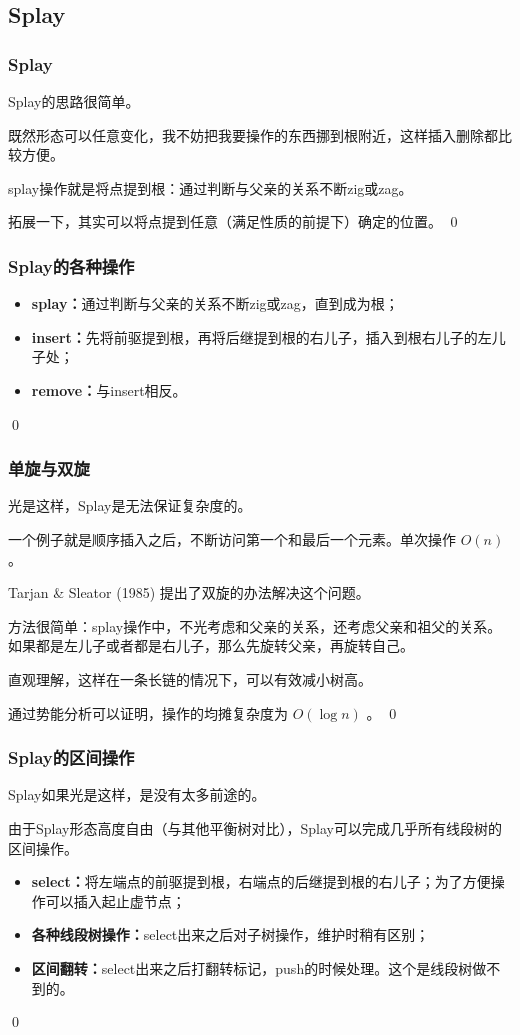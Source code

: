 \documentclass[9pt,dvipsnames,table]{beamer}
\newenvironment{qedframe}{%
	\begin{frame}[environment=qedqedframe]%
	}{%
	\qed
	\end{frame}%
}
\begin{document}
\subsection{Splay}
\begin{qedframe}
	\frametitle{Splay}
	Splay的思路很简单。
	
	既然形态可以任意变化，我不妨把我要操作的东西挪到根附近，这样插入删除都比较方便。
	
	splay操作就是将点提到根：通过判断与父亲的关系不断zig或zag。
	
	拓展一下，其实可以将点提到任意（满足性质的前提下）确定的位置。
\end{qedframe}
\begin{qedframe}
	\frametitle{Splay的各种操作}
	\begin{itemize}
		\item \textbf{splay：}通过判断与父亲的关系不断zig或zag，直到成为根；
		\item \textbf{insert：}先将前驱提到根，再将后继提到根的右儿子，插入到根右儿子的左儿子处；
		\item \textbf{remove：}与insert相反。
	\end{itemize}
\end{qedframe}
\begin{qedframe}
	\frametitle{单旋与双旋}
	光是这样，Splay是无法保证复杂度的。
	
	一个例子就是顺序插入之后，不断访问第一个和最后一个元素。单次操作 $ O(n) $ 。\pause
	
	Tarjan \& Sleator (1985) 提出了双旋的办法解决这个问题。
	
	方法很简单：splay操作中，不光考虑和父亲的关系，还考虑父亲和祖父的关系。如果都是左儿子或者都是右儿子，那么先旋转父亲，再旋转自己。
	
	直观理解，这样在一条长链的情况下，可以有效减小树高。
	
	通过势能分析可以证明，操作的均摊复杂度为 $ O(\log n) $ 。
\end{qedframe}
\begin{qedframe}
	\frametitle{Splay的区间操作}
	Splay如果光是这样，是没有太多前途的。
	
	由于Splay形态高度自由（与其他平衡树对比），Splay可以完成几乎所有线段树的区间操作。
	\begin{itemize}
		\item \textbf{select：}将左端点的前驱提到根，右端点的后继提到根的右儿子；为了方便操作可以插入起止虚节点；
		\item \textbf{各种线段树操作：}select出来之后对子树操作，维护时稍有区别；
		\item \textbf{区间翻转：}select出来之后打翻转标记，push的时候处理。这个是线段树做不到的。
	\end{itemize}
\end{qedframe}
\end{document}
